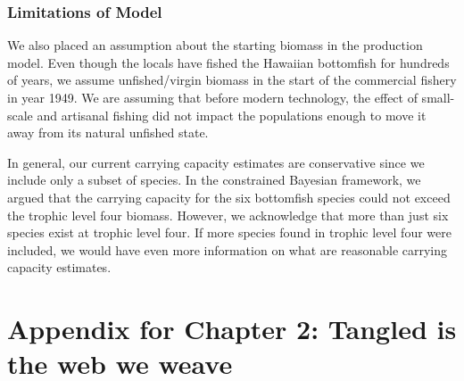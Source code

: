 \documentclass[oneside,12pt,final]{sty/ucthesis-CA2012}
\begin{document}
\begin{mainmatter}
\subsection{Limitations of Model}
We also placed an assumption about the starting biomass in the production model. Even though the locals have fished the Hawaiian bottomfish for hundreds of years, we assume unfished/virgin biomass in the start of the commercial fishery in year 1949. We are assuming that before modern technology, the effect of small-scale and artisanal fishing did not impact the populations enough to move it away from its natural unfished state. 

\vspace{5mm}

In general, our current carrying capacity estimates are conservative since we include only a subset of species. In the constrained Bayesian framework, we argued that the carrying capacity for the six bottomfish species could not exceed the trophic level four biomass. However, we acknowledge that more than just six species exist at trophic level four. If more species found in trophic level four were included, we would have even more information on what are reasonable carrying capacity estimates. 





\appendix

\dsp

\chapter{Appendix for Chapter 2: Tangled is the web we weave}{\label{appendix:a}}


\end{mainmatter}
\end{document}
